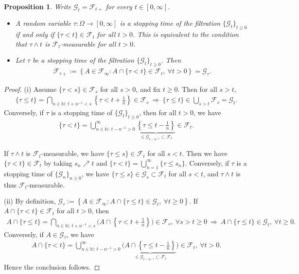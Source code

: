 \documentclass{article}
\numberwithin{equation}{section}
\theoremstyle{plain}
\newtheorem{proposition}[theorem]{Proposition}
\theoremstyle{definition}
\begin{document}
\begin{proposition}\label{prop:3.10} Write $\mathscr{G}_t=\mathscr{F}_{t+}$ for every $t\in[0,\infty]$.
\begin{itemize}
	\item[(i)] A random variable $\tau:\Omega\to[0,\infty]$ is a stopping time of the filtration $\{\mathscr{G}_t\}_{t\geq 0}$ if and only if $\{\tau <t\}\in\mathscr{F}_t$ for all $t>0$. This is equivalent to the condition that $\tau\wedge t$ is $\mathscr{F}_t$-measurable for all $t> 0$.
	\item[(ii)] Let $\tau$ be a stopping time of the filtration $\{\mathscr{G}_t\}_{t\geq 0}$. Then 
	\begin{align*}
		\mathscr{F}_{\tau+}:=\left\{A\in\mathscr{F}_\infty:A\cap\{\tau <t\}\in\mathscr{F}_t,\ \forall t> 0\right\}=\mathscr{G}_{\tau}.
	\end{align*}
\end{itemize}
\end{proposition}
\begin{proof}
(i) Assume $\{\tau<s\}\in\mathscr{F}_s$ for all $s>0$, and fix $t\geq 0$. Then for all $s>t$,
\begin{align*}
	\{\tau\leq t\}=\bigcap_{n\in\mathbb{N}:\,t+n^{-1}<s}\left\{\tau<t+\frac{1}{n}\right\}\in\mathscr{F}_s\ \Rightarrow\ \{\tau\leq t\}\in\bigcup_{s>t}\mathscr{F}_s=\mathscr{G}_t.
\end{align*}
Conversely, if $\tau$ is a stopping time of $\{\mathscr{G}_t\}_{t\geq 0}$, then for all $t>0$, we have
\begin{align*}
	\{\tau<t\}=\bigcup_{n\in\mathbb{N}:\,t-n^{-1}>0}^\infty\underbrace{\left\{\tau\leq t-\frac{1}{n}\right\}}_{\in\mathscr{G}_{t-n^{-1}}\subset\mathscr{F}_t}\in\mathscr{F}_t.
\end{align*}

If $\tau\wedge t$ is $\mathscr{F}_t$-measurable, we have $\{\tau\leq s\}\in\mathscr{F}_t$ for all $s<t$. Then we have $\{\tau<t\}\in\mathscr{F}_t$ by taking $s_n\nearrow t$ and $\{\tau<t\}=\bigcup_{n=1}^\infty\{\tau\leq s_n\}$. Conversely, if $\tau$ is a stopping time of $\{\mathscr{G}_n\}_{n\geq 0}$, we have $\{\tau\leq s\}\in\mathscr{G}_s\subset\mathscr{F}_t$ for all $s<t$, and $\tau\wedge t$ is thus $\mathscr{F}_t$-measurable.

(ii) By definition, $\mathscr{G}_\tau:=\left\{A\in\mathscr{F}_\infty: A\cap\{\tau\leq t\}\in\mathscr{G}_t,\ \forall t\geq 0\right\}$. If $A\cap\{\tau<t\}\in\mathscr{F}_t$ for all $t>0$, then
\begin{align*}
	A\cap\{\tau\leq t\} = \bigcap_{n\in\mathbb{N}:\,t+n^{-1}<s}\biggl(A\cap\left\{\tau <t+\frac{1}{n}\right\}\biggr)\in\mathscr{F}_s,\ \forall s>t\geq 0\ \Rightarrow\  A\cap\{\tau\leq t\}\in\mathscr{G}_t,\ \forall t\geq 0.
\end{align*}
Conversely, if $A\in\mathscr{G}_\tau$, we have
\begin{align*}
	A\cap\{\tau<t\} = \bigcup_{n\in\mathbb{N}:\,t-n^{-1}>0}^\infty\biggl(\underbrace{A\cap\left\{\tau\leq t-\frac{1}{n}\right\}}_{\in\mathscr{G}_{t-n^{-1}}\subset\mathscr{F}_t}\biggr)\in\mathscr{F}_t,\ \forall t>0.
\end{align*}
Hence the conclusion follows. 
\end{proof}
\end{document}

